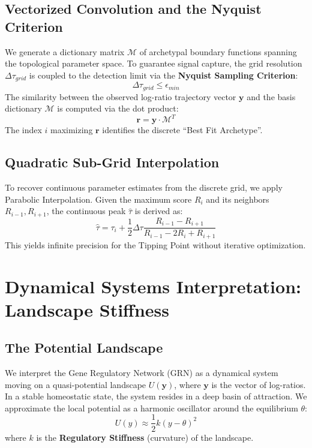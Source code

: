 \documentclass[11pt, a4paper]{article}
\begin{document}
\subsection{Vectorized Convolution and the Nyquist Criterion}
We generate a dictionary matrix $\mathcal{M}$ of archetypal boundary functions spanning the topological parameter space. To guarantee signal capture, the grid resolution $\Delta\tau_{grid}$ is coupled to the detection limit via the \textbf{Nyquist Sampling Criterion}:
\begin{equation}
    \Delta\tau_{grid} \le \epsilon_{min}
\end{equation}
The similarity between the observed log-ratio trajectory vector $\mathbf{y}$ and the basis dictionary $\mathcal{M}$ is computed via the dot product:
\begin{equation}
    \mathbf{r} = \mathbf{y} \cdot \mathcal{M}^T
\end{equation}
The index $i$ maximizing $\mathbf{r}$ identifies the discrete ``Best Fit Archetype''.

\subsection{Quadratic Sub-Grid Interpolation}
To recover continuous parameter estimates from the discrete grid, we apply Parabolic Interpolation. Given the maximum score $R_i$ and its neighbors $R_{i-1}, R_{i+1}$, the continuous peak $\hat{\tau}$ is derived as:
\begin{equation}
    \hat{\tau} = \tau_i + \frac{1}{2} \Delta\tau \frac{R_{i-1} - R_{i+1}}{R_{i-1} - 2R_i + R_{i+1}}
\end{equation}
This yields infinite precision for the Tipping Point without iterative optimization.

\section{Dynamical Systems Interpretation: Landscape Stiffness}

\subsection{The Potential Landscape}
We interpret the Gene Regulatory Network (GRN) as a dynamical system moving on a quasi-potential landscape $U(\mathbf{y})$, where $\mathbf{y}$ is the vector of log-ratios. In a stable homeostatic state, the system resides in a deep basin of attraction. We approximate the local potential as a harmonic oscillator around the equilibrium $\theta$:
\begin{equation}
    U(y) \approx \frac{1}{2} k (y - \theta)^2
\end{equation}
where $k$ is the \textbf{Regulatory Stiffness} (curvature) of the landscape.
\end{document}
